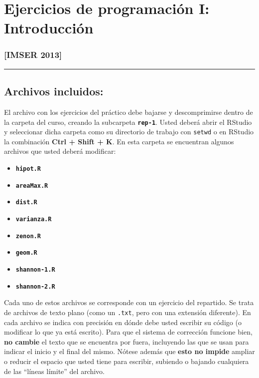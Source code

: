 \documentclass[]{article}
\begin{document}
\section{Ejercicios de programación I: Introducción}

\subsubsection{{[}IMSER 2013{]}}

\begin{center}\rule{3in}{0.4pt}\end{center}

\subsection{Archivos incluidos:}

El archivo con los ejercicios del práctico debe bajarse y descomprimirse
dentro de la carpeta del curso, creando la subcarpeta
\textbf{\texttt{rep-1}}. Usted deberá abrir el RStudio y seleccionar
dicha carpeta como su directorio de trabajo con \texttt{setwd} o en
RStudio la combinación \textbf{Ctrl + Shift + K}. En esta carpeta se
encuentran algunos archivos que usted deberá modificar:

\begin{itemize}
\item
  \textbf{\texttt{hipot.R}}
\item
  \textbf{\texttt{areaMax.R}}
\item
  \textbf{\texttt{dist.R}}
\item
  \textbf{\texttt{varianza.R}}
\item
  \textbf{\texttt{zenon.R}}
\item
  \textbf{\texttt{geom.R}}
\item
  \textbf{\texttt{shannon-1.R}}
\item
  \textbf{\texttt{shannon-2.R}}
\end{itemize}
Cada uno de estos archivos se corresponde con un ejercicio del
repartido. Se trata de archivos de texto plano (como un \texttt{.txt},
pero con una extensión diferente). En cada archivo se indica con
precisión en dónde debe usted escribir su código (o modificar lo que ya
está escrito). Para que el sistema de corrección funcione bien,
\textbf{no cambie} el texto que se encuentra por fuera, incluyendo las
que se usan para indicar el inicio y el final del mismo. Nótese además
que \textbf{esto no impide} ampliar o reducir el espacio que usted tiene
para escribir, subiendo o bajando cualquiera de las ``líneas límite''
del archivo.
\end{document}
